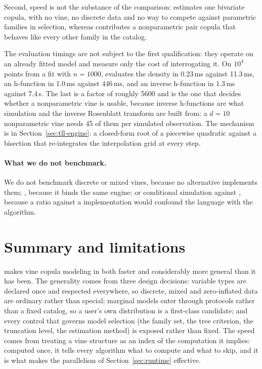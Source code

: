 \documentclass[article]{jss}
\begin{document}
Second, speed is not the substance of the comparison: 
estimates one bivariate copula, with no vine, no discrete data and no way to
compete against parametric families in selection, whereas 
contributes a nonparametric pair copula that behaves like every other family
in the catalog.

The evaluation timings are not subject to the first qualification: they
operate on an already fitted model and measure only the cost of interrogating
it.  On $10^4$ points from a fit
with $n = 1000$,  evaluates the density in 0.23\,ms against
11.3\,ms, an h-function in 1.0\,ms against 446\,ms, and an inverse h-function
in 1.3\,ms against 7.4\,s.  The last is a factor of roughly 5600 and is the one
that decides whether a nonparametric vine is usable, because inverse
h-functions are what simulation and the inverse Rosenblatt transform are built
from: a $d = 10$ nonparametric vine needs 45 of them per simulated observation.
The mechanism is in Section~\ref{sec:tll-engine}: a closed-form root of a
piecewise quadratic against a bisection that re-integrates the interpolation
grid at every step.

\paragraph{What we do not benchmark.}  We do not benchmark discrete or mixed
vines, because no alternative implements them; , because
it binds the same engine; or conditional simulation against 
\citep{claassen2024}, because a ratio against a 
implementation would confound the language with the algorithm.

\section{Summary and limitations}\label{sec:summary}

 makes vine copula modeling in  both faster and
considerably more general than it has been.  The generality comes from three
design decisions: variable types are declared once and respected everywhere, so
discrete, mixed and zero-inflated data are ordinary rather than special;
marginal models enter through protocols rather than a fixed catalog, so a
user's own distribution is a first-class candidate; and every control that
governs model selection (the family set, the tree criterion, the truncation
level, the estimation method) is exposed rather than fixed.  The speed comes
from treating a vine structure as an index of the computation it implies:
computed once, it tells every algorithm what to compute and what to skip, and
it is what makes the parallelism of Section~\ref{sec:runtime} effective.
\end{document}
